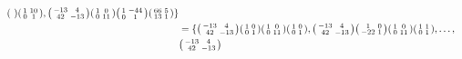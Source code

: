 \begin{itemize}
\begin{align*}
\begin{psmallmatrix}
\end{psmallmatrix}
\begin{psmallmatrix}
1 & 10 \\ 0 & 1
\end{psmallmatrix},
\begin{psmallmatrix}
-13 & 4 \\ 42 & -13
\end{psmallmatrix}
\begin{psmallmatrix}
1 & 0 \\ 0 & 11
\end{psmallmatrix}
\begin{psmallmatrix}
1 & -44 \\ 0 & 1
\end{psmallmatrix}
\begin{psmallmatrix}
66 & 5 \\ 13 & 1
\end{psmallmatrix}
\} \\ 
&= \{ \begin{psmallmatrix}
-13 & 4 \\ 42 & -13
\end{psmallmatrix}
\begin{psmallmatrix}
1 & 0 \\ 0 & 1
\end{psmallmatrix}
\begin{psmallmatrix}
1 & 0 \\ 0 & 11
\end{psmallmatrix}
\begin{psmallmatrix}
1 & 0 \\ 0 & 1
\end{psmallmatrix},
\begin{psmallmatrix}
-13 & 4 \\ 42 & -13
\end{psmallmatrix}
\begin{psmallmatrix}
1 & 0 \\ -22 & 1
\end{psmallmatrix}
\begin{psmallmatrix}
1 & 0 \\ 0 & 11
\end{psmallmatrix}
\begin{psmallmatrix}
1 & 1 \\ 0 & 1
\end{psmallmatrix}, \ldots, \\ 
& \begin{psmallmatrix}
-13 & 4 \\ 42 & -13
\end{psmallmatrix}

\end{align*}
\end{itemize}

